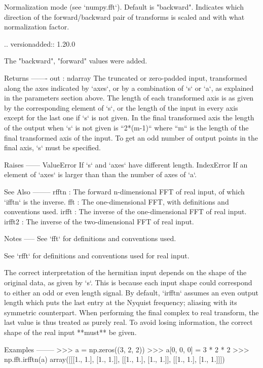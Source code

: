 \begin{DoxyVerb}
    Normalization mode (see `numpy.fft`). Default is "backward".
    Indicates which direction of the forward/backward pair of transforms
    is scaled and with what normalization factor.

    .. versionadded:: 1.20.0

        The "backward", "forward" values were added.

Returns
-------
out : ndarray
    The truncated or zero-padded input, transformed along the axes
    indicated by `axes`, or by a combination of `s` or `a`,
    as explained in the parameters section above.
    The length of each transformed axis is as given by the corresponding
    element of `s`, or the length of the input in every axis except for the
    last one if `s` is not given.  In the final transformed axis the length
    of the output when `s` is not given is ``2*(m-1)`` where ``m`` is the
    length of the final transformed axis of the input.  To get an odd
    number of output points in the final axis, `s` must be specified.

Raises
------
ValueError
    If `s` and `axes` have different length.
IndexError
    If an element of `axes` is larger than than the number of axes of `a`.

See Also
--------
rfftn : The forward n-dimensional FFT of real input,
        of which `ifftn` is the inverse.
fft : The one-dimensional FFT, with definitions and conventions used.
irfft : The inverse of the one-dimensional FFT of real input.
irfft2 : The inverse of the two-dimensional FFT of real input.

Notes
-----
See `fft` for definitions and conventions used.

See `rfft` for definitions and conventions used for real input.

The correct interpretation of the hermitian input depends on the shape of
the original data, as given by `s`. This is because each input shape could
correspond to either an odd or even length signal. By default, `irfftn`
assumes an even output length which puts the last entry at the Nyquist
frequency; aliasing with its symmetric counterpart. When performing the
final complex to real transform, the last value is thus treated as purely
real. To avoid losing information, the correct shape of the real input
**must** be given.

Examples
--------
>>> a = np.zeros((3, 2, 2))
>>> a[0, 0, 0] = 3 * 2 * 2
>>> np.fft.irfftn(a)
array([[[1.,  1.],
        [1.,  1.]],
       [[1.,  1.],
        [1.,  1.]],
       [[1.,  1.],
        [1.,  1.]]])\end{DoxyVerb}
 \mbox{\label{namespacenumpy_1_1fft_1_1__pocketfft_a6dddded3ebee31e4163fc5278d7591e3}} 
